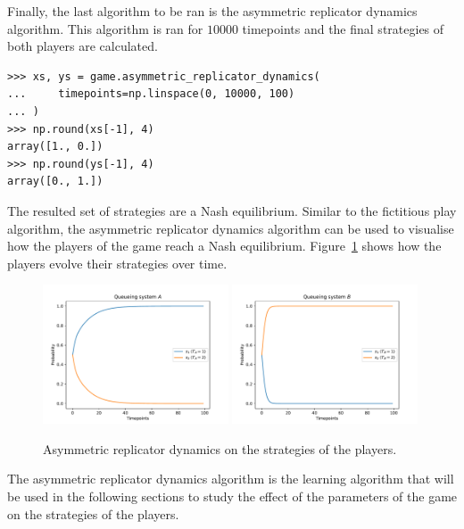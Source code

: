Finally, the last algorithm to be ran is the asymmetric replicator dynamics
algorithm.
This algorithm is ran for \(10000\) timepoints and the final strategies of
both players are calculated.

\begin{lstlisting}[style=pystyle]
>>> xs, ys = game.asymmetric_replicator_dynamics(
...     timepoints=np.linspace(0, 10000, 100)    
... )
>>> np.round(xs[-1], 4)
array([1., 0.])
>>> np.round(ys[-1], 4)
array([0., 1.])

\end{lstlisting}

The resulted set of strategies are a Nash equilibrium.
Similar to the fictitious play algorithm, the asymmetric replicator dynamics
algorithm can be used to visualise how the players of the game reach a Nash
equilibrium.
Figure~\ref{fig:solving_game_asymmetric_replicator_example} shows how the
players evolve their strategies over time.

\begin{figure}[H]
    \centering
    \includegraphics[width=0.49\textwidth]{chapters/04_game_theoretic_model/Bin/numeric_results/asymmetric_replicator_dynamics_A.pdf}
    \includegraphics[width=0.49\textwidth]{chapters/04_game_theoretic_model/Bin/numeric_results/asymmetric_replicator_dynamics_B.pdf}
    \caption{Asymmetric replicator dynamics on the strategies of the players.}
    \label{fig:solving_game_asymmetric_replicator_example}
\end{figure}

The asymmetric replicator dynamics algorithm is the learning algorithm that
will be used in the following sections to study the effect of the parameters
of the game on the strategies of the players.
